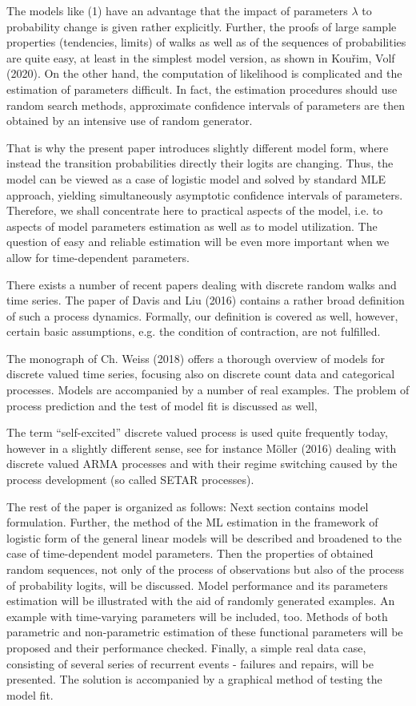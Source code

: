 \documentclass[11pt]{article}
\begin{document}
The models like (1) have an advantage that the impact of
parameters $\lambda$ to probability change is given rather
explicitly. Further, the proofs of large sample properties
(tendencies, limits) of walks as well as of the sequences of
probabilities are quite easy, at least in the simplest model
version, as shown in Kou\v{r}im, Volf (2020). On the other hand,
the computation of likelihood is complicated and the estimation of parameters
difficult. In fact, the estimation procedures should use random
search methods, approximate confidence intervals of parameters are
then obtained by an intensive use of random generator.

That is why the present paper introduces slightly different model
form, where instead the transition probabilities directly their
logits are changing. Thus, the model can be viewed as a case of
logistic model and solved by standard MLE approach, yielding
simultaneously asymptotic confidence intervals of parameters.
Therefore, we shall concentrate here to practical aspects of the
model, i.e. to aspects of model parameters estimation as well as
to model utilization. The question of easy and reliable estimation
will be even more important when we allow for time-dependent
parameters.

There exists a number of recent papers dealing
with discrete random walks and time series. The paper of
Davis and Liu (2016)  contains a rather
broad definition of such a process dynamics. Formally, our
definition is covered as well, however, certain basic assumptions, e.g.
the condition of contraction, are not fulfilled.

The monograph of Ch. Weiss (2018) offers a thorough overview of models  for discrete
valued time series, focusing also on discrete count data and categorical processes.
Models are accompanied by a number of real examples. The problem of process prediction and
the test of model fit is discussed as well,

The term ``self-excited'' discrete valued process is used quite frequently today,
however in a slightly different sense, see for instance Möller (2016) dealing with
discrete valued ARMA processes  and with their regime switching caused by the
process development (so called SETAR processes).

  \medskip
The rest of the paper is organized as follows: Next section
contains model formulation. Further, the method of the ML
estimation in the framework of logistic form of the general linear
models will be described and broadened to the case of
time-dependent model parameters. Then the properties of obtained
random sequences, not only of the process of observations but also
of the process of probability logits, will be discussed. Model
performance and its parameters estimation will be illustrated with
the aid of randomly generated examples. An example with
time-varying parameters will be included, too. Methods of both parametric and non-parametric
estimation of these functional parameters will be proposed and their performance checked.
Finally, a simple real data case, consisting of several series of recurrent events - failures and repairs,
will be presented. The solution is accompanied by a graphical method of testing the model fit.
\end{document}
